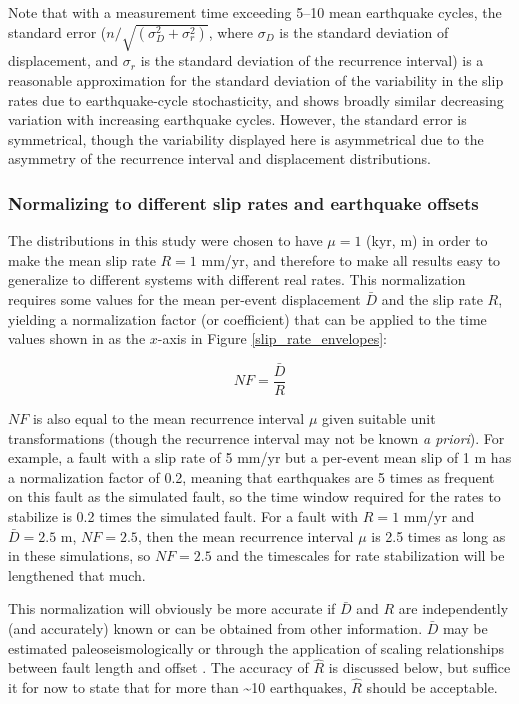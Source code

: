 \documentclass[se]{copernicus}
\begin{document}
Note that with a measurement time exceeding 5--10 mean earthquake cycles, the
standard error ($n / \sqrt{(\sigma_D^2 + \sigma_r^2)}$, where $\sigma_D$ is
the standard deviation of displacement, and $\sigma_r$ is the standard
deviation of the recurrence interval) is a reasonable approximation for the
standard deviation of the variability in the slip rates due to
earthquake-cycle stochasticity, and shows broadly similar decreasing
variation with increasing earthquake cycles. However, the standard error is
symmetrical, though the variability displayed here is asymmetrical due to the
asymmetry of the recurrence interval and displacement distributions.

\subsubsection{Normalizing to different slip rates and earthquake
offsets}\label{normalizing-to-different-slip-rates-and-earthquake-offsets}

The distributions in this study were chosen to have \(\mu=1\) (kyr, m)
in order to make the mean slip rate \(R=1\) mm/yr, and therefore to make
all results easy to generalize to different systems with different real
rates. This normalization requires some values for the mean per-event
displacement \(\bar{D}\) and the slip rate \(R\), yielding a
normalization factor (or coefficient) that can be applied to the time
values shown in as the \(x\)-axis in Figure \ref{slip_rate_envelopes}:

\begin{equation}
  NF = \frac{\bar{D}}{R}
  \label{norm_eqn}
\end{equation}

\(NF\) is also equal to the mean recurrence interval \(\mu\) given
suitable unit transformations (though the recurrence interval may not be
known \emph{a priori}). For example, a fault with a slip rate of 5 mm/yr
but a per-event mean slip of 1 m has a normalization factor of 0.2,
meaning that earthquakes are 5 times as frequent on this fault as the
simulated fault, so the time window required for the rates to stabilize
is 0.2 times the simulated fault. For a fault with \(R=1\) mm/yr and
\(\bar{D}=2.5\) m, \(NF=2.5\), then the mean recurrence interval \(\mu\)
is 2.5 times as long as in these simulations, so \(NF=2.5\) and the
timescales for rate stabilization will be lengthened that much.

This normalization will obviously be more accurate if \(\bar{D}\) and \(R\) are
independently (and accurately) known or can be obtained from other information.
\(\bar{D}\) may be estimated paleoseismologically or through the application of
scaling relationships between fault length and offset
\citep{wells_new_1994,leonard_earthquake_2010}. The accuracy of \(\hat{R}\) is
discussed below, but suffice it for now to state that for more than
\textasciitilde{}10 earthquakes, \(\hat{R}\) should be acceptable.
\end{document}

